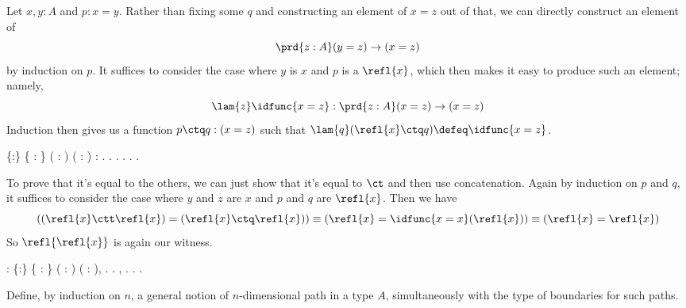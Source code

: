  \soln
Let $x, y : A$ and $p : x = y$.  Rather than fixing some $q$ and
constructing an element of $x = z$ out of that, we can directly
construct an element of
\[
  \prd{z:A} (y = z) \to (x = z)
\]
by induction on $p$.  It suffices to consider the case where $y$ is
$x$ and $p$ is a $\refl{x}$, which then makes it easy to produce such
an element; namely,
\[
  \lam{z}\idfunc{x=z} : \prd{z:A} (x = z) \to (x = z)
\]
Induction then gives us a function $p \ctq q : (x = z)$ such that
$\lam{q}(\refl{x} \ctq q) \defeq \idfunc{x=z}$.
\begin{coqdoccode}
\coqdocemptyline
\coqdocnoindent
{}  \{:\} \{   : \} ( :  \coqdocnotation{=} ) ( :  \coqdocnotation{=} ) :  \coqdocnotation{=} .\coqdoceol
\coqdocindent{1.00em}
 .  .\coqdoceol
\coqdocindent{1.00em}
 . .\coqdoceol
\coqdocnoindent
{}.\coqdoceol
\coqdocemptyline
\end{coqdoccode}
To prove that it's equal to the others, we can just show that it's
equal to $\ct$ and then use concatenation.  Again by induction on $p$
and $q$, it suffices to consider the case where $y$ and $z$ are $x$
and $p$ and $q$ are $\refl{x}$.  Then we have
\[
  \left((\refl{x} \ctt \refl{x}) = (\refl{x} \ctq \refl{x})\right)
  \equiv
  \left(\refl{x} = \idfunc{x=x}(\refl{x})\right)
  \equiv
  \left(\refl{x} = \refl{x}\right)
\] 
So $\refl{\refl{x}}$ is again our witness.\begin{coqdoccode}
\coqdocemptyline
\coqdocnoindent
{}  : \coqdockw{\ensuremath{\forall}} \{:\} \{   : \} ( :  \coqdocnotation{=} ) ( :  \coqdocnotation{=} ),\coqdoceol
\coqdocindent{1.00em}
\coqdocnotation{(}  \coqdocnotation{)} \coqdocnotation{=} \coqdocnotation{(}  \coqdocnotation{)}.\coqdoceol
\coqdocnoindent
{}.\coqdoceol
\coqdocindent{1.00em}
 , . .\coqdoceol
\coqdocnoindent
{}.\coqdoceol
\coqdocemptyline
\end{coqdoccode}
Define, by induction on $n$, a general notion of $n$-dimensional path
in a type $A$, simultaneously with the type of boundaries for such paths. 

